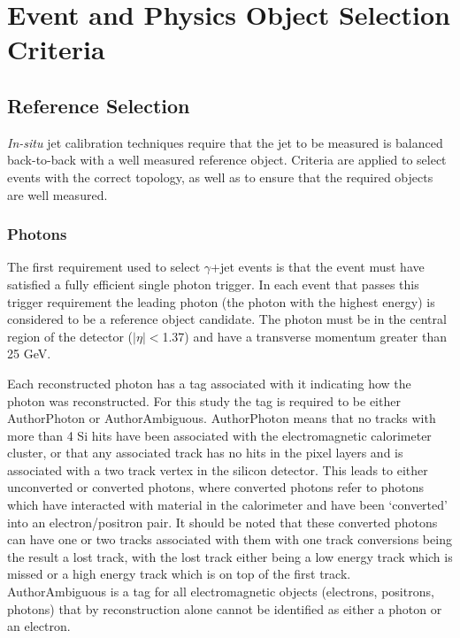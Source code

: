 \section{Event and Physics Object Selection Criteria}
\label{Sec:SelectionCriteria}
\subsection{Reference Selection}
\textit{In-situ} jet calibration techniques require that the jet to be measured is balanced back-to-back with a well measured reference object.  
Criteria are applied to select events with the correct topology, as well as to ensure that the required objects are well measured.  

\subsubsection{Photons}
\label{Sec:Photons}
The first requirement used to select $\gamma$+jet events is that the event must have satisfied a fully efficient single photon trigger.  
In each event that passes this trigger requirement the leading photon (the photon with the highest energy) is considered to be a reference object candidate.  
The photon must be in the central region of the detector ($\mid\eta\mid<$1.37) and have a transverse momentum greater than 25 GeV.  

Each reconstructed photon has a tag associated with it indicating how the photon was reconstructed.  
For this study the tag is required to be either AuthorPhoton or AuthorAmbiguous.  
AuthorPhoton means that no tracks with more than 4 Si hits have been associated with the electromagnetic calorimeter cluster, or that any associated track has no hits in the pixel layers and is associated with a two track vertex in the silicon detector.  
This leads to either unconverted or converted photons, where converted photons refer to photons which have interacted with material in the calorimeter and have been `converted' into an electron/positron pair.  
It should be noted that these converted photons can have one or two tracks associated with them with one track conversions being the result a lost track, with the lost track either being a low energy track which is missed or a high energy track which is on top of the first track.  
AuthorAmbiguous is a tag for all electromagnetic objects (electrons, positrons, photons) that by reconstruction alone cannot be identified as either a photon or an electron.  


